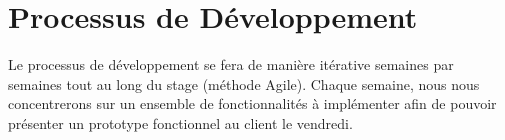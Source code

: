 \section{Processus de Développement}
Le processus de développement se fera de manière itérative semaines par semaines tout au long du stage (méthode Agile). Chaque semaine, nous nous concentrerons sur un ensemble de fonctionnalités à implémenter afin de pouvoir présenter un prototype fonctionnel au client le vendredi.

